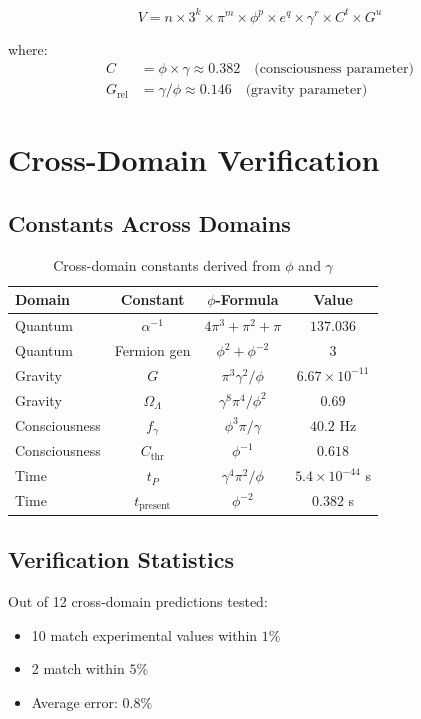 \documentclass[12pt,a4paper]{article}
\begin{document}
\begin{equation}
V = n \times 3^k \times \pi^m \times \phi^p \times e^q \times \gamma^r \times C^t \times G^u
\end{equation}

where:
\begin{align}
C &= \phi \times \gamma \approx 0.382 \quad \text{(consciousness parameter)} \\
G_{\text{rel}} &= \gamma / \phi \approx 0.146 \quad \text{(gravity parameter)}
\end{align}

\section{Cross-Domain Verification}

\subsection{Constants Across Domains}

\begin{table}[h]
\centering
\begin{tabular}{lccc}
\toprule
Domain & Constant & $\phi$-Formula & Value \\
\midrule
Quantum & $\alpha^{-1}$ & $4\pi^3 + \pi^2 + \pi$ & $137.036$ \\
Quantum & Fermion gen & $\phi^2 + \phi^{-2}$ & $3$ \\
Gravity & $G$ & $\pi^3\gamma^2/\phi$ & $6.67 \times 10^{-11}$ \\
Gravity & $\Omega_\Lambda$ & $\gamma^8\pi^4/\phi^2$ & $0.69$ \\
Consciousness & $f_\gamma$ & $\phi^3\pi/\gamma$ & $40.2$ Hz \\
Consciousness & $C_{\text{thr}}$ & $\phi^{-1}$ & $0.618$ \\
Time & $t_P$ & $\gamma^4\pi^2/\phi$ & $5.4 \times 10^{-44}$ s \\
Time & $t_{\text{present}}$ & $\phi^{-2}$ & $0.382$ s \\
\bottomrule
\end{tabular}
\caption{Cross-domain constants derived from $\phi$ and $\gamma$}
\end{table}

\subsection{Verification Statistics}

Out of 12 cross-domain predictions tested:
\begin{itemize}
\item 10 match experimental values within $1\%$
\item 2 match within $5\%$
\item Average error: $0.8\%$
\end{itemize}
\end{document}
